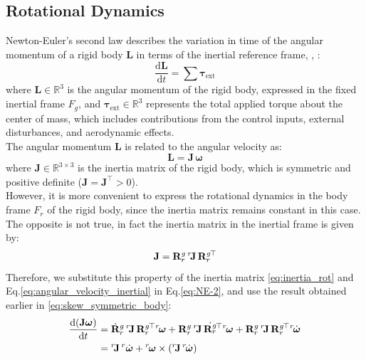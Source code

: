 \subsection{Rotational Dynamics} 
Newton-Euler's second law describes the variation in time of the angular momentum of a rigid body $\mathbf{L}$ 
in terms of the inertial reference frame, \cite{quadrotor_modeling_control_book}, \cite{book-robotics}:
\begin{equation}
    \frac{\mathrm{d} \mathbf{L}}{\mathrm{d}t} = \sum \boldsymbol{\tau}_{\text{ext}}
    \label{eq:NE-2}
\end{equation}
where \( \mathbf{L} \in \mathbb{R}^3 \) is the angular momentum of the rigid body,
expressed in the fixed inertial frame \( F_g \), and \( \boldsymbol{\tau}_{\text{ext}} \in \mathbb{R}^3 \) 
represents the total applied torque about the center of mass, which includes contributions 
from the control inputs, external disturbances, and aerodynamic effects.
\noindent \\
The angular momentum \( \mathbf{L} \) is related to the angular velocity as:
\begin{equation}
    \mathbf{L} = \mathbf{J} \, \boldsymbol{\omega}
    \label{eq:angular_momentum}
\end{equation}
where \( \mathbf{J} \in \mathbb{R}^{3 \times 3} \) is the inertia matrix of the rigid body, 
which is symmetric and positive definite (\( \mathbf{J} = \mathbf{J}^\top > 0 \)).
\noindent \\
However, it is more convenient to express the rotational dynamics 
in the body frame \( F_r \) of the rigid body, since the inertia matrix remains constant in this case. 
The opposite is not true, in fact the inertia matrix in the inertial frame is given by:
\begin{equation}
    \mathbf{J} =  \mathbf{R}^g_r \, {}^r\mkern-3mu\mathbf{J} \,  {\mathbf{R}^g_r}\mkern-2mu^\top 
    \label{eq:inertia_rot}
\end{equation}
Therefore, we substitute this property of the inertia matrix \eqref{eq:inertia_rot} and 
Eq.\ref{eq:angular_velocity_inertial} in Eq.\ref{eq:NE-2}, 
and use the result obtained earlier in \ref{eq:skew_symmetric_body}:
\begin{align}
    \frac{\mathrm{d} (\mathbf{J} \boldsymbol{\omega})}{\mathrm{d}t} &= 
    \dot{\mathbf{R}}^g_r \, {}^r\mkern-3mu\mathbf{J} \, {\mathbf{R}^g_r}\mkern-2mu^\top  {}^r\mkern-2mu\boldsymbol{\omega} +
    \mathbf{R}^g_r \, {}^r\mkern-3mu\mathbf{J} \, \dot{\mathbf{R}^g_r}\mkern-2mu^\top  {}^r\mkern-2mu\boldsymbol{\omega} \notag 
     + \mathbf{R}^g_r \, {}^r\mkern-3mu\mathbf{J} \, {\mathbf{R}^g_r}\mkern-2mu^\top  {}^r\mkern-2mu\dot{\boldsymbol{\omega}} \notag \\
    &= {}^r\mkern-3mu\mathbf{J} \, {}^r\dot{\boldsymbol{\omega}} + 
    {}^r\mkern-2mu\boldsymbol{\omega} \times ({}^r\mkern-3mu\mathbf{J} \, {}^r\mkern-2mu\dot{\boldsymbol{\omega}})
    \label{eq:derivazione_rotational_law}
\end{align}
